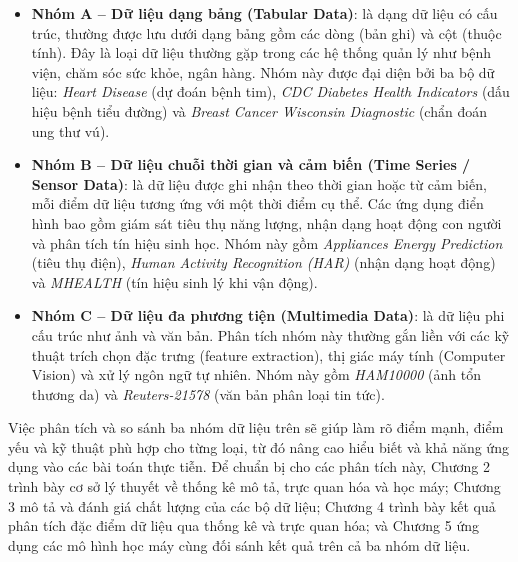 \begin{itemize}[leftmargin=1.6em,label=\textbullet]
    \item \textbf{Nhóm A -- Dữ liệu dạng bảng (Tabular Data)}: là dạng dữ liệu có cấu trúc, thường được lưu dưới dạng bảng gồm các dòng (bản ghi) và cột (thuộc tính). Đây là loại dữ liệu thường gặp trong các hệ thống quản lý như bệnh viện, chăm sóc sức khỏe, ngân hàng. Nhóm này được đại diện bởi ba bộ dữ liệu: \textit{Heart Disease} (dự đoán bệnh tim), \textit{CDC Diabetes Health Indicators} (dấu hiệu bệnh tiểu đường) và \textit{Breast Cancer Wisconsin Diagnostic} (chẩn đoán ung thư vú).
    \item \textbf{Nhóm B -- Dữ liệu chuỗi thời gian và cảm biến (Time Series / Sensor Data)}: là dữ liệu được ghi nhận theo thời gian hoặc từ cảm biến, mỗi điểm dữ liệu tương ứng với một thời điểm cụ thể. Các ứng dụng điển hình bao gồm giám sát tiêu thụ năng lượng, nhận dạng hoạt động con người và phân tích tín hiệu sinh học. Nhóm này gồm \textit{Appliances Energy Prediction} (tiêu thụ điện), \textit{Human Activity Recognition (HAR)} (nhận dạng hoạt động) và \textit{MHEALTH} (tín hiệu sinh lý khi vận động).
    \item \textbf{Nhóm C -- Dữ liệu đa phương tiện (Multimedia Data)}: là dữ liệu phi cấu trúc như ảnh và văn bản. Phân tích nhóm này thường gắn liền với các kỹ thuật trích chọn đặc trưng (feature extraction), thị giác máy tính (Computer Vision) và xử lý ngôn ngữ tự nhiên. Nhóm này gồm \textit{HAM10000} (ảnh tổn thương da) và \textit{Reuters-21578} (văn bản phân loại tin tức).
\end{itemize}

Việc phân tích và so sánh ba nhóm dữ liệu trên sẽ giúp làm rõ điểm mạnh, điểm yếu và kỹ thuật phù hợp cho từng loại, từ đó nâng cao hiểu biết và khả năng ứng dụng vào các bài toán thực tiễn. Để chuẩn bị cho các phân tích này, Chương 2 trình bày cơ sở lý thuyết về thống kê mô tả, trực quan hóa và học máy; Chương 3 mô tả và đánh giá chất lượng của các bộ dữ liệu; Chương 4 trình bày kết quả phân tích đặc điểm dữ liệu qua thống kê và trực quan hóa; và Chương 5 ứng dụng các mô hình học máy cùng đối sánh kết quả trên cả ba nhóm dữ liệu.

